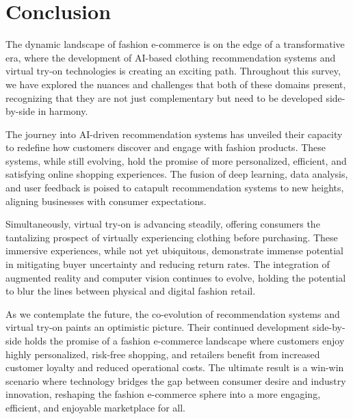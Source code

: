 \section{Conclusion} \label{section:conclusion}
	The dynamic landscape of fashion e-commerce is on the edge of a transformative era, where the development of AI-based clothing recommendation systems and virtual try-on technologies is creating an exciting path. Throughout this survey, we have explored the nuances and challenges that both of these domains present, recognizing that they are not just complementary but need to be developed side-by-side in harmony.

	The journey into AI-driven recommendation systems has unveiled their capacity to redefine how customers discover and engage with fashion products. These systems, while still evolving, hold the promise of more personalized, efficient, and satisfying online shopping experiences. The fusion of deep learning, data analysis, and user feedback is poised to catapult recommendation systems to new heights, aligning businesses with consumer expectations.

	Simultaneously, virtual try-on is advancing steadily, offering consumers the tantalizing prospect of virtually experiencing clothing before purchasing. These immersive experiences, while not yet ubiquitous, demonstrate immense potential in mitigating buyer uncertainty and reducing return rates. The integration of augmented reality and computer vision continues to evolve, holding the potential to blur the lines between physical and digital fashion retail.

	As we contemplate the future, the co-evolution of recommendation systems and virtual try-on paints an optimistic picture. Their continued development side-by-side holds the promise of a fashion e-commerce landscape where customers enjoy highly personalized, risk-free shopping, and retailers benefit from increased customer loyalty and reduced operational costs. The ultimate result is a win-win scenario where technology bridges the gap between consumer desire and industry innovation, reshaping the fashion e-commerce sphere into a more engaging, efficient, and enjoyable marketplace for all.
